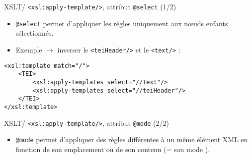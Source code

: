 \documentclass{beamer}
\begin{document}
    \begin{frame}[fragile]{XSLT/ \texttt{<xsl:apply-template/>}, attribut \texttt{@select} (1/2)}
        \Large
        \begin{itemize}
            \item \texttt{@select} permet d'appliquer les règles uniquement aux n\oe uds enfants sélectionnés.
            \bigskip
            \item Exemple $\rightarrow$ inverser le \texttt{<teiHeader/>} et le \texttt{<text/>} : 
        \end{itemize}
        \normalsize
        \begin{verbatim}
<xsl:template match="/">
    <TEI>
        <xsl:apply-templates select="//text"/>
        <xsl:apply-templates select="//teiHeader"/>
    </TEI>
</xsl:template>
        \end{verbatim}

    \end{frame}

    \begin{frame}{XSLT/ \texttt{<xsl:apply-template/>}, attribut \texttt{@mode} (2/2)}
        \Large
        \begin{itemize}
            \item \texttt{@mode} permet d'appliquer des règles différentes à un même élément XML en fonction de son emplacement ou de son contenu (= son \og mode \fg).
        \end{itemize}
    \end{frame} 
\end{document}
